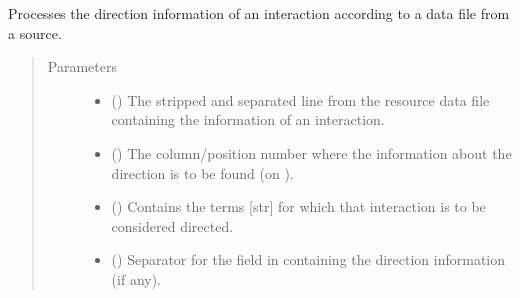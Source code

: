 \documentclass[letterpaper,10pt,english]{sphinxmanual}
\begin{document}
\begin{fulllineitems}

\begin{fulllineitems}
\label{\detokenize{reference:pypath.main.PyPath.prdb_tissue_expr}}
\end{fulllineitems}


\begin{fulllineitems}
\label{\detokenize{reference:pypath.main.PyPath.process_direction}}
Processes the direction information of an interaction according
to a data file from a source.
\begin{quote}\begin{description}
\item[{Parameters}] \leavevmode\begin{itemize}
\item {} 
 () \textendash{} The stripped and separated line from the resource data file
containing the information of an interaction.

\item {} 
 () \textendash{} The column/position number where the information about the
direction is to be found (on ).

\item {} 
 () \textendash{} Contains the terms {[}str{]} for which that interaction is to be
considered directed.

\item {} 
 () \textendash{} Separator for the field in  containing the direction
information (if any).


\end{itemize}
\end{description}
\end{quote}
\end{fulllineitems}
\end{fulllineitems}
\end{document}
